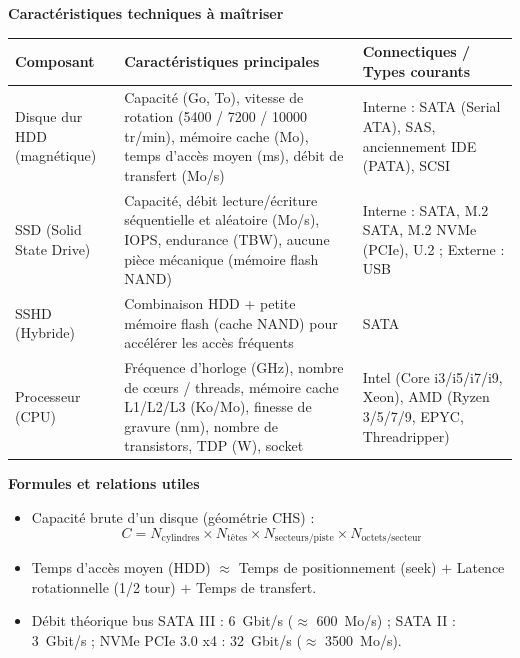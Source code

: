 \documentclass[11pt]{article}
\begin{document}
\begin{aretenir}
\textbf{Caractéristiques techniques à maîtriser}
\begin{center}
\begin{tabularx}{\linewidth}{|l|X|X|}
\hline
\rowcolor{popblueL} \textbf{Composant} & \textbf{Caractéristiques principales} & \textbf{Connectiques / Types courants} \\
\hline
Disque dur HDD (magnétique) & Capacité (Go, To), vitesse de rotation (5400 / 7200 / 10000 tr/min), mémoire cache (Mo), temps d'accès moyen (ms), débit de transfert (Mo/s) & Interne : SATA (Serial ATA), SAS, anciennement IDE (PATA), SCSI \\ 
\hline
SSD (Solid State Drive) & Capacité, débit lecture/écriture séquentielle et aléatoire (Mo/s), IOPS, endurance (TBW), aucune pièce mécanique (mémoire flash NAND) & Interne : SATA, M.2 SATA, M.2 NVMe (PCIe), U.2 ; Externe : USB \\
\hline
SSHD (Hybride) & Combinaison HDD + petite mémoire flash (cache NAND) pour accélérer les accès fréquents & SATA \\
\hline
Processeur (CPU) & Fréquence d'horloge (GHz), nombre de cœurs / threads, mémoire cache L1/L2/L3 (Ko/Mo), finesse de gravure (nm), nombre de transistors, TDP (W), socket & Intel (Core i3/i5/i7/i9, Xeon), AMD (Ryzen 3/5/7/9, EPYC, Threadripper) \\
\hline
\end{tabularx}
\end{center}

\textbf{Formules et relations utiles}
\begin{itemize}
  \item Capacité brute d'un disque (géométrie CHS) : 
  \[ C = N_{\text{cylindres}} \times N_{\text{têtes}} \times N_{\text{secteurs/piste}} \times N_{\text{octets/secteur}} \]
  \item Temps d'accès moyen (HDD) $\approx$ Temps de positionnement (seek) $+$ Latence rotationnelle (1/2 tour) $+$ Temps de transfert.
  \item Débit théorique bus SATA III : \SI{6}{Gbit/s} ($\approx$ \SI{600}{Mo/s}) ; SATA II : \SI{3}{Gbit/s} ; NVMe PCIe 3.0 x4 : \SI{32}{Gbit/s} ($\approx$ \SI{3500}{Mo/s}).
\end{itemize}


\end{aretenir}
\end{document}
